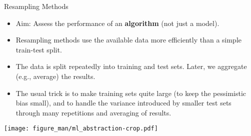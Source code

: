 \begin{vbframe}{Resampling Methods}

\begin{itemize}
  \item Aim: Assess the performance of an \textbf{algorithm} (not just a model).
  \item Resampling methods use the available data more efficiently than a simple train-test split.
  \item The data is split repeatedly into training and test sets. Later, we aggregate (e.g., average) the results.
  \item The usual trick is to make training sets quite large (to keep the pessimistic bias small),
  and to handle the variance introduced by smaller test sets through many repetitions and averaging
  of results.
\end{itemize}

\begin{center}
\texttt{[image: figure\_man/ml\_abstraction-crop.pdf]}
\end{center}

\end{vbframe}


